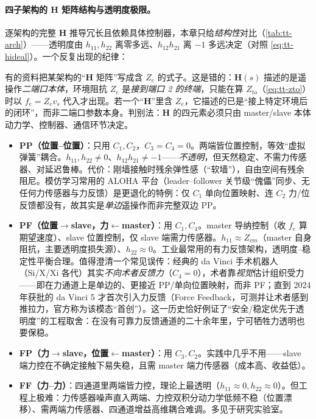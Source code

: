 \paragraph{四子架构的 H 矩阵结构与透明度极限。}
逐架构的完整 $\mathbf H$ 推导冗长且依赖具体控制器，本章只给\emph{结构性}对比（\cref{tab:tt-arch}）——透明度由 $h_{11},h_{22}$ 离零多远、$h_{12}h_{21}$ 离 $-1$ 多远决定（对照 \cref{eq:tt-hideal}）。一个反复出现的纪律：

\begin{pitfall}
有的资料把某架构的“$\mathbf H$ 矩阵”写成含 $Z_e$ 的式子。这是错的：$\mathbf H(s)$ 描述的是遥操作\emph{二端口本体}，环境阻抗 $Z_e$ 是\emph{接到端口 2 的终端}，只能在算 $Z_{to}$（\cref{eq:tt-zto}）时以 $f_e=Z_e v_s$ 代入才出现。若一个“$\mathbf H$”里含 $Z_e$，它描述的已是“接上特定环境后的闭环”，而非二端口参数本身。判别法：$\mathbf H$ 的四元素必须只由 master/slave 本体动力学、控制器、通信环节决定。
\end{pitfall}

\begin{itemize}
  \item \textbf{PP（位置--位置）}：只用 $C_1,C_2$，$C_3=C_4=0$。两端皆位置控制，等效“虚拟弹簧”耦合。$h_{11},h_{22}\neq0$、$h_{12}h_{21}\neq-1$——\emph{不透明}，但天然稳定、不需力传感器、对延迟鲁棒。代价：刚墙接触时残余弹性感（“软墙”），自由空间有残余阻尼。模仿学习常用的 ALOHA 平台（leader--follower 关节级“傀儡”同步、无任何力传感器与力反馈）是更退化的特例：仅 $C_1$ 单向位置映射、连 $C_2$ 力/位反馈都没有，故其实是\emph{单边}遥操作而非完整双边 PP。
  \item \textbf{PF（位置$\to$slave，力$\leftarrow$master）}：用 $C_1,C_4$。master 导纳控制（收 $f_e$ 算期望速度）、slave 位置控制，仅 slave 端需力传感器。$h_{11}\approx Z_{cm}$（master 自身阻抗，主要透明度损失源）、$h_{22}\approx0$。工业最常用的有力反馈架构，透明度--稳定性平衡合理。值得澄清一个常见误传：经典的 da Vinci 手术机器人（Si/X/Xi 各代）其实\emph{不向术者反馈力}（$C_4=0$），术者靠\emph{视觉}估计组织受力——即在力通道上是单边的、更接近 PP/单向位置映射，而非 PF；直到 2024 年获批的 da Vinci 5 才首次引入力反馈（Force Feedback，可测并让术者感到推拉力，官方称为该模态“首创”）。这一历史恰好例证了“安全/稳定优先于透明度”的工程取舍：在没有可靠力反馈通道的二十余年里，宁可牺牲力透明也要保稳。
  \item \textbf{FP（力$\to$slave，位置$\leftarrow$master）}：用 $C_3,C_2$。实践中几乎不用——slave 端力控在不确定接触下易失稳，且需 master 端力传感器（成本高、收益低）。
  \item \textbf{FF（力--力）}：四通道里两端皆力控，理论上最透明（$h_{11}\approx0,h_{22}\approx0$）。但工程上极难：力传感器噪声直入两端、力控双积分动力学低频不稳（位置漂移）、需两端力传感器、四通道增益高维耦合难调。多见于研究实验室。
\end{itemize}

